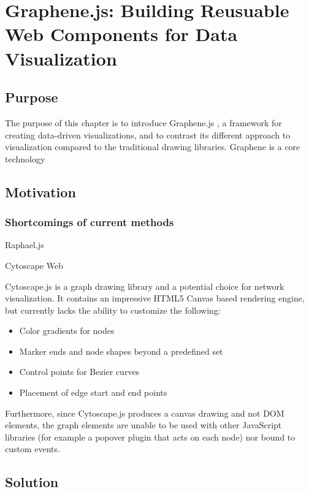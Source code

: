 \chapter{Graphene.js: Building Reusuable Web Components for Data Visualization}

\section{Purpose}

The purpose of this chapter is to introduce Graphene.js \autocite{gu2014graphene}, a framework for creating data-driven visualizations, and to contrast its different approach to visualization compared to the traditional drawing libraries. Graphene is a core technology 

\section{Motivation}

\subsection{Shortcomings of current methods}

Raphael.js \autocite{sencha2014raphael}

Cytoscape Web \autocite{cytoscape2014web}

Cytoscape.js \autocite{cytoscape2014js} is a graph drawing library and a potential choice for network visualization. It contains an impressive HTML5 Canvas based rendering engine, but currently lacks the ability to customize the following:

\begin{itemize}
\item Color gradients for nodes
\item Marker ends and node shapes beyond a predefined set
\item Control points for Bezier curves
\item Placement of edge start and end points
\end{itemize}

Furthermore, since Cytoscape.js produces a canvas drawing and not DOM elements, the graph elements are unable to be used with other JavaScript libraries (for example a popover plugin that acts on each node) nor bound to custom events.

\section{Solution}

